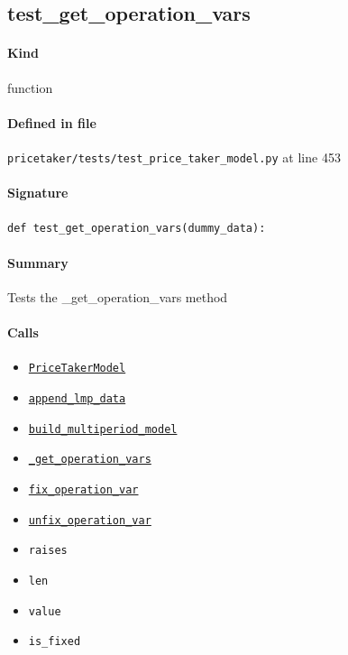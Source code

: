 \documentclass[11pt]{report}
\begin{document}
\subsection{test\_get\_operation\_vars}
\label{def:pricetaker-tests-test_price_taker_model.py:test_get_operation_vars:L453}
\paragraph{Kind} function
\paragraph{Defined in file} \texttt{pricetaker/tests/test\_price\_taker\_model.py} at line 453
\paragraph{Signature} \texttt{def test\_get\_operation\_vars(dummy\_data):}
\paragraph{Summary} Tests the \_get\_operation\_vars method
\paragraph{Calls}
\begin{itemize}[leftmargin=*]
  \item \hyperref[def:pricetaker-price_taker_model.py:PriceTakerModel:L161]{\texttt{PriceTakerModel}}
  \item \hyperref[def:pricetaker-price_taker_model.py:PriceTakerModel.append_lmp_data:L221]{\texttt{append\_lmp\_data}}
  \item \hyperref[def:pricetaker-price_taker_model.py:PriceTakerModel.build_multiperiod_model:L291]{\texttt{build\_multiperiod\_model}}
  \item \hyperref[def:pricetaker-price_taker_model.py:PriceTakerModel._get_operation_vars:L482]{\texttt{\_get\_operation\_vars}}
  \item \hyperref[def:pricetaker-price_taker_model.py:PriceTakerModel.fix_operation_var:L504]{\texttt{fix\_operation\_var}}
  \item \hyperref[def:pricetaker-price_taker_model.py:PriceTakerModel.unfix_operation_var:L518]{\texttt{unfix\_operation\_var}}
  \item \texttt{raises}
  \item \texttt{len}
  \item \texttt{value}
  \item \texttt{is\_fixed}
\end{itemize}
\end{document}
